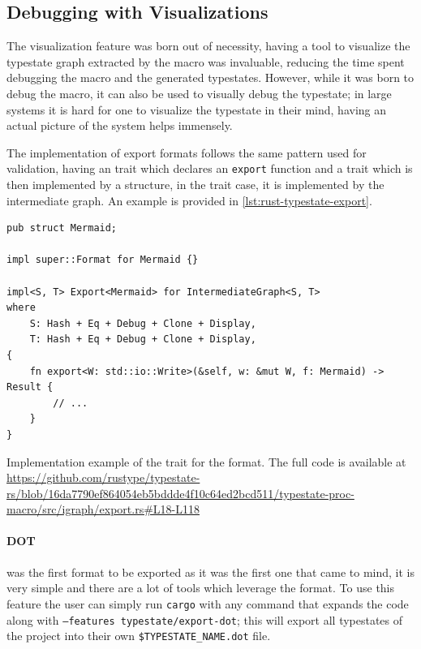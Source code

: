 \subsection{Debugging with Visualizations}

The visualization feature was born out of necessity,
having a tool to visualize the typestate graph extracted by the macro was invaluable,
reducing the time spent debugging the macro and the generated typestates.
However, while it was born to debug the macro, it can also be used to visually debug the typestate;
in large systems it is hard for one to visualize the typestate in their mind,
having an actual picture of the system helps immensely.

The implementation of export formats follows the same pattern used for validation,
having an  trait which declares an \texttt{export} function and a  trait which is then implemented by a structure,
in the  trait case, it is implemented by the intermediate graph.
An example is provided in \autoref{lst:rust-typestate-export}.

\begin{listing}
    \begin{verbatim}
pub struct Mermaid;

impl super::Format for Mermaid {}

impl<S, T> Export<Mermaid> for IntermediateGraph<S, T>
where
    S: Hash + Eq + Debug + Clone + Display,
    T: Hash + Eq + Debug + Clone + Display,
{
    fn export<W: std::io::Write>(&self, w: &mut W, f: Mermaid) -> Result {
        // ...
    }
}
    \end{verbatim}
    \caption{Implementation example of the  trait for the  format. The full code is available at \url{https://github.com/rustype/typestate-rs/blob/16da7790ef864054eb5bddde4f10c64ed2bcd511/typestate-proc-macro/src/igraph/export.rs\#L18-L118}}
    \label{lst:rust-typestate-export}
\end{listing}

\paragraph{DOT} was the first format to be exported as it was the first one that came to mind,
it is very simple and there are a lot of tools which leverage the format.
To use this feature the user can simply run \texttt{cargo} with any command that expands the code along with \texttt{--features typestate/export-dot};
this will export all typestates of the project into their own \texttt{\$TYPESTATE\_NAME.dot} file.

